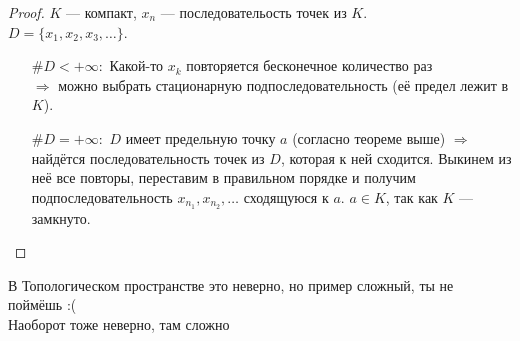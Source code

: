 \begin{proof}
    $K$ --- компакт, $x_n$ --- последовательость точек из $K$. \\
    $D = \{x_1,x_2,x_3,\dots \}$.

    \begin{itemize}
        \item[$\#D < +\infty:$] Какой-то $x_k$ повторяется бесконечное количество раз \\
        $\Longrightarrow$ можно выбрать стационарную подпоследовательность (её предел лежит в $K$).
        \item[$\#D = +\infty:$] $D$ имеет предельную точку $a$ (согласно теореме выше) $\Longrightarrow$ найдётся последовательность точек
        из $D$, которая к ней сходится. Выкинем из неё все повторы, переставим в правильном порядке и получим
        подпоследовательность $x_{n_1}, x_{n_2},\dots $ сходящуюся к $a$. $a \in K$, так как $K$ --- замкнуто.
    \end{itemize}

\end{proof}
    
\notice \quad В Топологическом пространстве это неверно, но пример сложный, ты не поймёшь :( \\
Наоборот тоже неверно, там сложно